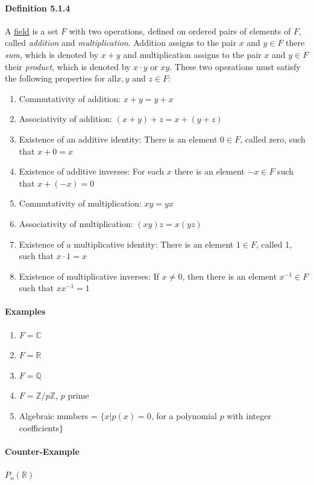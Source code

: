 \documentclass[11pt]{article}
\newcommand{\ti}[1]{\textit{#1}}
\newcommand{\mb}[1]{\mathbb{#1}}
\newcommand{\under}[1]{\underline{#1}}
\newcommand{\real}[0]{\mathbb{R}}
\newcommand{\mc}[0]{\mathbb{C}}
\begin{document}
{\paragraph{Definition 5.1.4} A \under{field} is a set $F$ with two operations, defined on ordered pairs of elements of $F$, called \ti{addition} and \ti{multiplication}. Addition assigns to the pair $x$ and $y \in F$ there \ti{sum}, which is denoted by $x+y$ and multiplication assigns to the pair $x$ and $y \in F$ their \ti{product}, which is denoted by $x\cdot y$ or $xy$. These two operations must satisfy the following properties for all$x,y$ and $z \in F$:
\begin{enumerate}
	\item Commutativity of addition: $x+y = y+x$
	\item Associativity of addition: $(x+y)+z=x+(y+z)$
	\item Existence of an additive identity: There is an element $0 \in F$, called zero, such that $x+0 = x$
	\item Existence of additive inverses: For each $x$ there is an element $-x \in F$ such that $x + (-x) = 0$
	\item Commutativity of multiplication: $xy = yx$
	\item Associativity of multiplication: $(xy)z = x(yz)$
	\item Existence of a multiplicative identity: There is an element $1 \in F$, called 1, such that $x \cdot 1 = x$
	\item Existence of multiplicative inverses: If $x \neq 0$, then there is an element $x^{-1} \in F$ such that $xx^{-1} = 1$
\end{enumerate}

\paragraph{Examples}
\begin{enumerate}
	\item $F = \mc$
	\item $F = \real$
	\item $F = \mb{Q}$
	\item $F = \mb{Z} / p\mb{Z}$, $p$ prime
	\item Algebraic numbers = $\{x|p(x) = 0$, for a polynomial $p$ with integer coefficients$\}$
\end{enumerate}
\paragraph{Counter-Example}
$P_n(\real)$

}
\end{document}

